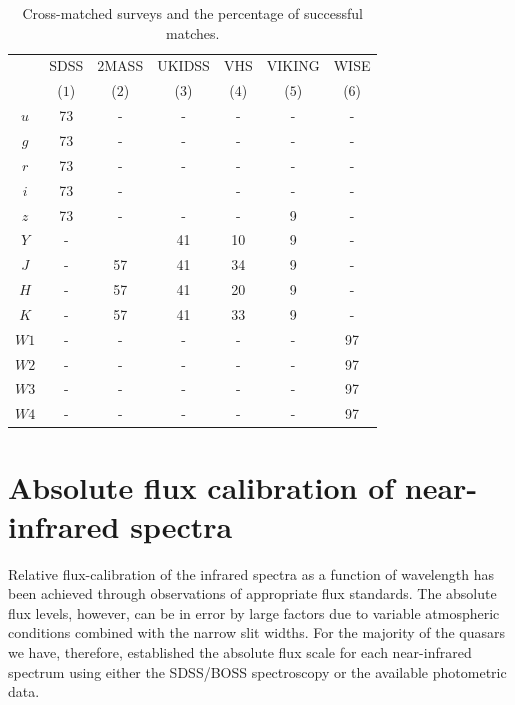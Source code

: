 \begin{table}
  \centering
  \footnotesize 
  \caption{Cross-matched surveys and the percentage of successful matches.}
  \label{tab:cross-matching}
    \begin{tabular}{ccccccc} 
    \hline
     & SDSS & $2$MASS & UKIDSS & VHS & VIKING & WISE \\
     & ($1$) & ($2$) & ($3$) & ($4$) & ($5$) & ($6$) \\ 
    \hline
    $u$ & 73 & - & - & - & - & - \\
    $g$ & 73 & - & - & - & - & - \\
    $r$ & 73 & - & - & - & - & - \\
    $i$ & 73 & - &  & - & - & - \\
    $z$ & 73 & - & - & - & 9 & - \\
    $Y$ & - &  & 41 & 10 & 9 & - \\
    $J$ & - & 57 & 41 & 34 & 9 & - \\
    $H$ & - & 57 & 41 & 20 & 9 & - \\
    $K$ & - & 57 & 41 & 33 & 9 & - \\
    $W1$ & - & - & - & - & - & 97 \\
    $W2$ & - & - & - & - & - & 97 \\
    $W3$ & - & - & - & - & - & 97 \\
    $W4$ & - & - & - & - & - & 97 \\
    \hline
    \end{tabular}
\end{table} 

\section{Absolute flux calibration of near-infrared spectra}

Relative flux-calibration of the infrared spectra as a function of wavelength has been achieved through observations of appropriate flux standards. 
The absolute flux levels, however, can be in error by large factors due to variable atmospheric conditions combined with the narrow slit widths. 
For the majority of the quasars we have, therefore, established the absolute flux scale for each near-infrared spectrum using either the SDSS/BOSS spectroscopy or the available photometric data.

